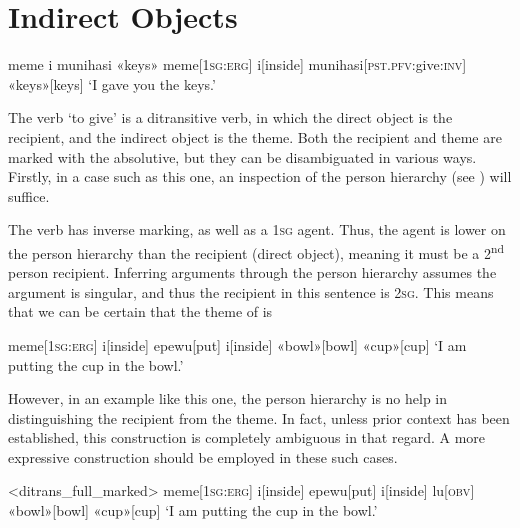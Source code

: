 

\section{Indirect Objects}
\ex
\begingl
\glpreamble meme i munihasi «keys»
\endpreamble
meme[\textsc{1sg:erg}]
i[inside]
munihasi[\textsc{pst.pfv:}give\textsc{:inv}]
«keys»[keys]
\glft `I gave you the keys.'
\endgl
\xe

The verb  `to give' is a ditransitive verb, in which the direct object is the recipient, and the indirect object is the theme. Both the recipient and theme are marked with the absolutive, but they can be disambiguated in various ways. Firstly, in a case such as this one, an inspection of the person hierarchy (see ) will suffice.

The verb  has inverse marking, as well as a \textsc{1sg} agent. Thus, the agent is lower on the person hierarchy than the recipient (direct object), meaning it must be a 2\textsuperscript{nd} person recipient. Inferring arguments through the person hierarchy assumes the argument is singular, and thus the recipient in this sentence is \textsc{2sg}. This means that we can be certain that the theme of  is 

\ex
\begingl
\glpreamble
\pronounced{}\endpreamble
meme[\textsc{1sg:erg}]
i[inside]
epewu[put]
i[inside]
«bowl»[bowl]
«cup»[cup]
\glft `I am putting the cup in the bowl.'
\endgl
\xe

However, in an example like this one, the person hierarchy is no help in distinguishing the recipient from the theme. In fact, unless prior context has been established, this construction is completely ambiguous in that regard. A more expressive construction should be employed in these such cases.

\ex<ditrans_full_marked>
\begingl
\glpreamble
\pronounced{}\endpreamble
meme[\textsc{1sg:erg}]
i[inside]
epewu[put]
i[inside]
lu[\textsc{obv}]
«bowl»[bowl]
«cup»[cup]
\glft `I am putting the cup in the bowl.'
\endgl
\xe

